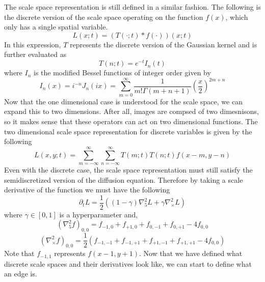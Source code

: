 \documentclass{article}
\begin{document}
The scale space representation is still defined in a similar fashion.
The following is the discrete version of the scale space operating on the function $f(x)$, which only has a single spatial variable.
\begin{equation}
  L(x;t) = (T(\cdot;t) * f(\cdot))(x;t)
\end{equation}
In this expression, $T$ represents the discrete version of the Gaussian kernel and is further evaluated as
\begin{equation}
  T(n;t) = e^{-t}I_n(t)
\end{equation}
where $I_n$ is the modified Bessel functions of integer order given by
\begin{equation}
  I_n(x) = i^{-n}J_{n}(ix) = \sum_{m=0}^{\infty}\frac{1}{m!\Gamma(m+n+1)}\left(\frac{x}{2}\right)^{2m+n}
\end{equation}
Now that the one dimensional case is understood for the scale space, we can expand this to two dimensions.
After all, images are compsed of two dimesnisons, so it makes sense that these operators can act on two dimensional functions.
The two dimensional scale space representation for discrete variables is given by the following
\begin{equation}
  L(x,y;t) = \sum_{m=-\infty}^{\infty}\sum_{n=-\infty}^{\infty}T(m;t)T(n;t)f(x-m,y-n)
\end{equation}
Even with the discrete case, the scale space representation must still satisfy the semidiscretized version of the diffusion equation.
Therefore by taking a scale derivative of the function we must have the following
\begin{equation}
  \partial_t L = \frac{1}{2}((1-\gamma)\nabla^2_5L+\gamma\nabla^2_\times L)
\end{equation}
where $\gamma \in [0,1]$ is a hyperparameter and,
\begin{equation}
  (\nabla^2_5f)_{0,0} = f_{-1,0} + f_{+1,0} + f_{0,-1} + f_{0,+1} - 4f_{0,0}
\end{equation}
\begin{equation}
  (\nabla^2_\times f)_{0,0} = \frac{1}{2}(f_{-1,-1} + f_{-1,+1} + f_{+1,-1} + f_{+1,+1} - 4f_{0,0})
\end{equation}
Note that $f_{-1,1}$ represents $f(x-1, y+1)$. Now that we have defined what discrete scale spaces and their derivatives look like, we can start to define what an edge is.
\end{document}
